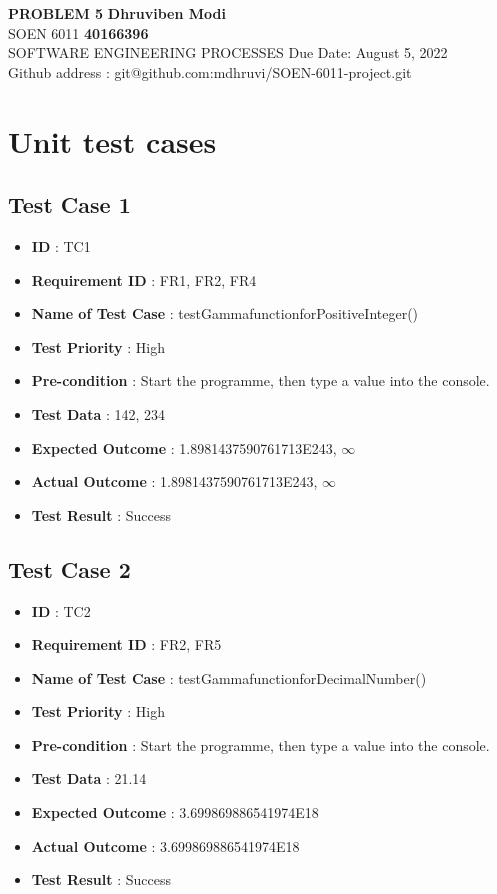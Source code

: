 \documentclass[a4paper, 11pt]{article}
\begin{document}
\noindent
\large\textbf{PROBLEM 5 } \hfill \textbf{Dhruviben Modi} \\
\normalsize SOEN 6011 \hfill \textbf{40166396} \\
 SOFTWARE ENGINEERING PROCESSES \hfill Due Date: August 5, 2022 \\
\hfill Github address : git@github.com:mdhruvi/SOEN-6011-project.git
\section{Unit test cases}

\subsection{Test Case 1}
\begin{itemize}
    \item \textbf{ID} : TC1
    \item \textbf{Requirement ID} : FR1, FR2, FR4
    \item \textbf{Name of Test Case} : testGammafunctionforPositiveInteger()
    \item \textbf{Test Priority} : High
    \item \textbf{Pre-condition} : Start the programme, then type a value into the console.
    \item \textbf{Test Data} : 142, 234
    \item \textbf{Expected Outcome} : 1.8981437590761713E243, $\infty$
    \item \textbf{Actual Outcome} : 1.8981437590761713E243, $\infty$
    \item \textbf{Test Result} : Success
\end{itemize}

\subsection{Test Case 2}
\begin{itemize}
    \item \textbf{ID} : TC2
    \item \textbf{Requirement ID} : FR2, FR5
    \item \textbf{Name of Test Case} : testGammafunctionforDecimalNumber()
    \item \textbf{Test Priority} : High
    \item \textbf{Pre-condition} : Start the programme, then type a value into the console.
    \item \textbf{Test Data} : 21.14
    \item \textbf{Expected Outcome} : 3.699869886541974E18
    \item \textbf{Actual Outcome} : 3.699869886541974E18
    \item \textbf{Test Result} : Success
\end{itemize}
\end{document}
